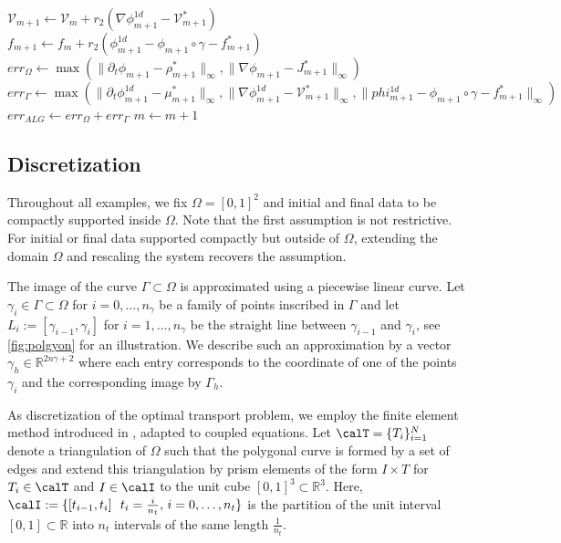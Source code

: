 \documentclass{article}
\def\R{{\mathbb R}}
\begin{document}
\begin{algorithm}[t]
\begin{algorithmic}
            \STATE $\mathcal{V}_{m+1} \leftarrow \mathcal{V}_{m} + r_2 \left( \nabla\phi^{1d}_{m+1} - \mathcal{V}^*_{m+1} \right)$
            \STATE $f_{m+1} \leftarrow f_{m} + r_2 \left( \phi^{1d}_{m+1} - \phi_{m+1}\circ\gamma - f^*_{m+1} \right)$
            \STATE $err_\Omega \leftarrow \max\left(\|\partial_t\phi_{m+1} - \rho^*_{m+1}\|_\infty, \|\nabla\phi_{m+1} - J^*_{m+1}\|_\infty\right)$ 
            \STATE $ err_\Gamma \leftarrow \max\left(\|\partial_t\phi^{1d}_{m+1} - \mu^*_{m+1}\|_\infty, \|\nabla\phi^{1d}_{m+1} - \mathcal{V}^*_{m+1} \|_\infty, \| phi^{1d}_{m+1} - \phi_{m+1}\circ\gamma - f^*_{m+1} \|_\infty \right)$
            \STATE $err_{ALG} \leftarrow err_\Omega + err_\Gamma$
            \STATE $m \leftarrow m+1$
        \ENDWHILE
    \end{algorithmic}
\end{algorithm}


\subsection{Discretization}\label{Discret}

Throughout all examples, we fix $\Omega=[0,1]^2$ and initial and final data to be compactly supported inside $\Omega$. Note that the first assumption is not restrictive. For initial or final data supported compactly but outside of $\Omega$, extending the domain $\Omega$ and rescaling the system recovers the assumption.

The image of the curve $\Gamma\subset\Omega$ is approximated using a piecewise linear curve. Let $\gamma_i\in\Gamma\subset\Omega$ for $i=0,\ldots,n_\gamma$ be a family of points inscribed in $\Gamma$ and let $L_i := [\gamma_{i-1},\gamma_i]$ for $i=1,\ldots,n_\gamma$ be the straight line between $\gamma_{i-1}$ and $\gamma_i$, see \autoref{fig:polgyon} for an illustration. We describe such an approximation by a vector $\gamma_h\in \R^{2n\gamma+2}$ where each entry corresponds to the coordinate of one of the points $\gamma_i$ and the corresponding image by $\Gamma_h$. 

As discretization of the optimal transport problem, we employ the finite element method introduced in \cite{fu_high_2023}, adapted to coupled equations.
Let $\calT = \{T_i\}_{i=1}^N$ denote a triangulation of $\Omega$ such that the polygonal curve is formed by a set of edges and extend this triangulation by prism elements of the form $I\times T$ for $T_i\in\calT$ and $I\in \calI$ to the unit cube $[0,1]^3\subset\R^3$. Here, $\calI := \{[t_{i-1}, t_i] \  \ t_i = \frac{i}{n_t}, \, i=0,\ldots,n_t\}$ is the partition of the unit interval $[0,1]\subset\R$ into $n_t$ intervals of the same length $\frac{1}{n_t}$.
\end{document}
